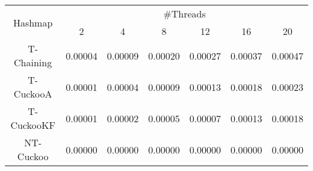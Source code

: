 \begin{tabular}{|c|c|c|c|c|c|c|}
\hline
\multirow{2}{*}{Hashmap} & \multicolumn{6}{c|}{\#Threads}\\\cline{2-7}& 2 & 4 & 8 & 12 & 16 & 20\\
\hline
\hline
T-Chaining & 0.00004 & 0.00009 & 0.00020 & 0.00027 & 0.00037 & 0.00047\\
T-CuckooA & 0.00001 & 0.00004 & 0.00009 & 0.00013 & 0.00018 & 0.00023\\
T-CuckooKF & 0.00001 & 0.00002 & 0.00005 & 0.00007 & 0.00013 & 0.00018\\
NT-Cuckoo & 0.00000 & 0.00000 & 0.00000 & 0.00000 & 0.00000 & 0.00000\\
\hline
\end{tabular}
